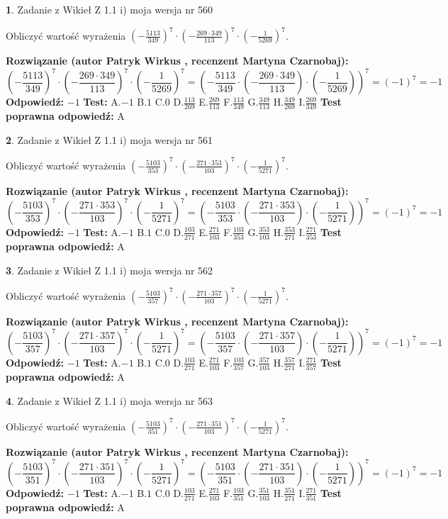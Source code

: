 \documentclass[12pt, a4paper]{article}
\theoremstyle{definition} %
\newtheorem{zad}{}
\newcommand{\zadStart}[1]{\begin{zad}#1\newline}
\newcommand{\zadStop}{\end{zad}}
\newcommand{\rozwStart}[2]{\noindent \textbf{Rozwiązanie (autor #1 , recenzent #2): }\newline}
\newcommand{\rozwStop}{\newline}
\newcommand{\odpStart}{\noindent \textbf{Odpowiedź:}\newline}
\newcommand{\odpStop}{\newline}
\newcommand{\testStart}{\noindent \textbf{Test:}\newline}
\newcommand{\testStop}{\newline}
\newcommand{\kluczStart}{\noindent \textbf{Test poprawna odpowiedź:}\newline}
\newcommand{\kluczStop}{\newline}
\begin{document}
\zadStart{Zadanie z Wikieł Z 1.1 i) moja wersja nr 560}

Obliczyć wartość wyrażenia $(-\frac{5113}{349})^{7} \cdot (-\frac{269 \cdot 349}{113})^{7} \cdot (-\frac{1}{5269})^{7}$.
\zadStop
\rozwStart{Patryk Wirkus}{Martyna Czarnobaj}
$$(-\frac{5113}{349})^{7} \cdot (-\frac{269 \cdot 349}{113})^{7} \cdot (-\frac{1}{5269})^{7} = (-\frac{5113}{349} \cdot (-\frac{269 \cdot 349}{113}) \cdot (-\frac{1}{5269}))^{7} = (-1)^{7} = -1$$
\rozwStop
\odpStart
$-1$
\odpStop
\testStart
A.$-1$ B.$1$ C.$0$ D.$\frac{113}{269}$ E.$\frac{269}{113}$
F.$\frac{113}{349}$ G.$\frac{349}{113}$
H.$\frac{349}{269}$
I.$\frac{269}{349}$
\testStop
\kluczStart
A
\kluczStop



\zadStart{Zadanie z Wikieł Z 1.1 i) moja wersja nr 561}

Obliczyć wartość wyrażenia $(-\frac{5103}{353})^{7} \cdot (-\frac{271 \cdot 353}{103})^{7} \cdot (-\frac{1}{5271})^{7}$.
\zadStop
\rozwStart{Patryk Wirkus}{Martyna Czarnobaj}
$$(-\frac{5103}{353})^{7} \cdot (-\frac{271 \cdot 353}{103})^{7} \cdot (-\frac{1}{5271})^{7} = (-\frac{5103}{353} \cdot (-\frac{271 \cdot 353}{103}) \cdot (-\frac{1}{5271}))^{7} = (-1)^{7} = -1$$
\rozwStop
\odpStart
$-1$
\odpStop
\testStart
A.$-1$ B.$1$ C.$0$ D.$\frac{103}{271}$ E.$\frac{271}{103}$
F.$\frac{103}{353}$ G.$\frac{353}{103}$
H.$\frac{353}{271}$
I.$\frac{271}{353}$
\testStop
\kluczStart
A
\kluczStop



\zadStart{Zadanie z Wikieł Z 1.1 i) moja wersja nr 562}

Obliczyć wartość wyrażenia $(-\frac{5103}{357})^{7} \cdot (-\frac{271 \cdot 357}{103})^{7} \cdot (-\frac{1}{5271})^{7}$.
\zadStop
\rozwStart{Patryk Wirkus}{Martyna Czarnobaj}
$$(-\frac{5103}{357})^{7} \cdot (-\frac{271 \cdot 357}{103})^{7} \cdot (-\frac{1}{5271})^{7} = (-\frac{5103}{357} \cdot (-\frac{271 \cdot 357}{103}) \cdot (-\frac{1}{5271}))^{7} = (-1)^{7} = -1$$
\rozwStop
\odpStart
$-1$
\odpStop
\testStart
A.$-1$ B.$1$ C.$0$ D.$\frac{103}{271}$ E.$\frac{271}{103}$
F.$\frac{103}{357}$ G.$\frac{357}{103}$
H.$\frac{357}{271}$
I.$\frac{271}{357}$
\testStop
\kluczStart
A
\kluczStop



\zadStart{Zadanie z Wikieł Z 1.1 i) moja wersja nr 563}

Obliczyć wartość wyrażenia $(-\frac{5103}{351})^{7} \cdot (-\frac{271 \cdot 351}{103})^{7} \cdot (-\frac{1}{5271})^{7}$.
\zadStop
\rozwStart{Patryk Wirkus}{Martyna Czarnobaj}
$$(-\frac{5103}{351})^{7} \cdot (-\frac{271 \cdot 351}{103})^{7} \cdot (-\frac{1}{5271})^{7} = (-\frac{5103}{351} \cdot (-\frac{271 \cdot 351}{103}) \cdot (-\frac{1}{5271}))^{7} = (-1)^{7} = -1$$
\rozwStop
\odpStart
$-1$
\odpStop
\testStart
A.$-1$ B.$1$ C.$0$ D.$\frac{103}{271}$ E.$\frac{271}{103}$
F.$\frac{103}{351}$ G.$\frac{351}{103}$
H.$\frac{351}{271}$
I.$\frac{271}{351}$
\testStop
\kluczStart
A
\kluczStop
\end{document}
